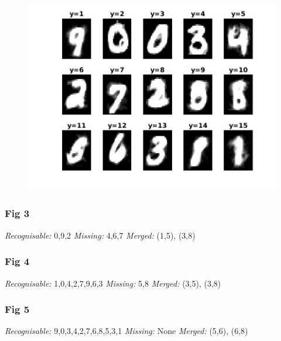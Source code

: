 \documentclass{article}
\begin{document}
\begin{figure}[h!]
\begin{multicols}{3}
\includegraphics[width=1\columnwidth]{RunResults2/5.png}
\label{5}
\end{multicols}
\end{figure}

\subsubsection{Fig 3}
\emph{Recognisable: } 0,9,2   \hspace{2cm}   \emph{Missing: } 4,6,7 \hspace{2cm}    \emph{Merged: } (1,5), (3,8)

\subsubsection{Fig 4}
\emph{Recognisable: } 1,0,4,2,7,9,6,3 \hspace{2cm} \emph{Missing: } 5,8 \hspace{2cm} \emph{Merged: } (3,5), (3,8)

\subsubsection{Fig 5}
\emph{Recognisable: } 9,0,3,4,2,7,6,8,5,3,1 \hspace{2cm} \emph{Missing: }  None \hspace{2cm} \emph{Merged: } (5,6), (6,8)
\end{document}
